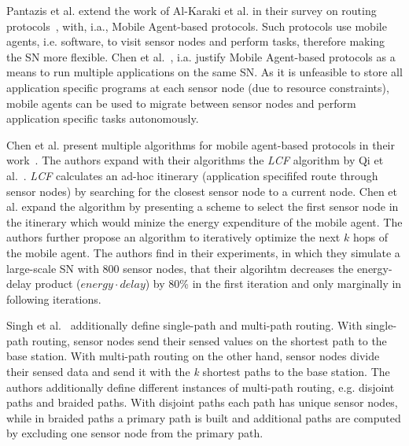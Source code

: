 Pantazis et al. extend the work of Al-Karaki et al. in their survey on routing
protocols~\cite{pantazis2013energy}, with, i.a., Mobile Agent-based protocols.
Such protocols use mobile agents, i.e. software, to visit sensor nodes and
perform tasks, therefore making the \ac{SN} more flexible. Chen et
al.~\cite{chen2007applications}, i.a. justify Mobile Agent-based protocols as a
means to run multiple applications on the same \ac{SN}. As it is unfeasible to
store all application specific programs at each sensor node (due to resource
constraints), mobile agents can be used to migrate between sensor nodes and
perform application specific tasks autonomously.

Chen et al. present multiple algorithms for mobile agent-based protocols in
their work~\cite{chen2011itinerary}. The authors expand with their algorithms
the \textit{LCF} algorithm by Qi et al.~\cite{qi2001optimal}. \textit{LCF}
calculates an ad-hoc itinerary (application specififed route through sensor
nodes) by searching for the closest sensor node to a current node. Chen et al.
expand the algorithm by presenting a scheme to select the first sensor node in
the itinerary which would minize the energy expenditure of the mobile agent.
The authors further propose an algorithm to iteratively optimize the next $ k $
hops of the mobile agent. The authors find in their experiments, in which they
simulate a large-scale \ac{SN} with 800 sensor nodes, that their algorihtm
decreases the energy-delay product ($ energy \cdot delay $) by 80\% in the first
iteration and only marginally in following iterations.

Singh et al.~\cite{singh2010routing} additionally define single-path and
multi-path routing. With single-path routing, sensor nodes send their sensed
values on the shortest path to the base station. With multi-path routing on the
other hand, sensor nodes divide their sensed data and send it with the
\textit{k} shortest paths to the base station. The authors additionally define
different instances of multi-path routing, e.g. disjoint paths and braided
paths. With disjoint paths each path has unique sensor nodes, while in braided
paths a primary path is built and additional paths are computed by excluding
one sensor node from the primary path.

